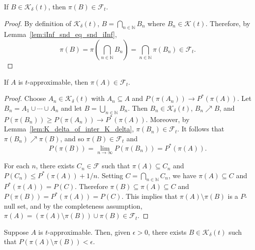 \begin{lemma}\label{lem:K_delta_of_inter_K_delta}
  \leanok
If $B \in \mathcal{K}_\delta (t)$, then $\pi(B) \in \mathcal{F}_t$.
\end{lemma}

\begin{proof}
  By definition of $\mathcal{K}_\delta(t)$, $B = \bigcap_{n\in\mathbb{N}} B_n$ where $B_n \in \mathcal{K}(t)$. Therefore, by Lemma~\ref{lem:iInf_snd_eq_snd_iInf}, \[\pi(B) = \pi \left(\bigcap_{n\in\mathbb{N}} B_n\right) = \bigcap_{n\in\mathbb{N}} \pi(B_n) \in \mathcal{F}_t .\]
\end{proof}

\begin{lemma}\label{lem:measurable_of_t_approx}
  \leanok
  If $A$ is $t$-approximable, then $\pi(A) \in \mathcal{F}_t$.
\end{lemma}

\begin{proof}
  Choose $A_n \in \mathcal{K}_\delta(t)$ with $A_n \subseteq A$ and
  $P(\pi(A_n)) \to P^*(\pi(A))$. Let $B_n = A_1 \cup \cdots \cup A_n$ and
  let $B = \bigcup_{n \in \mathbb{N}} B_n$. Then
  $B_n \in \mathcal{K}_\delta(t)$, $B_n \nearrow B$, and $P(\pi(B_n)) \geq P(\pi(A_n)) \to
  P^*(\pi(A))$.
  Moreover, by Lemma~\ref{lem:K_delta_of_inter_K_delta}, $\pi(B_n) \in \mathcal{F}_t$.
  It follows that $\pi(B_n) \nearrow \pi(B)$, and so $\pi(B) \in \mathcal{F}_t$ and
  $$P(\pi(B)) = \lim_{n \to \infty} P(\pi(B_n)) = P^*(\pi(A)).$$

  For each $n$, there exists $C_n \in \mathcal{F}$ such that
  $\pi(A) \subseteq C_n$ and $P(C_n) \leq P^*(\pi(A)) + 1/n$. Setting
  $C = \bigcap_{n \in \mathbb{N}} C_n$, we have $\pi(A) \subseteq C$ and $P^*(\pi(A)) = P(C)$.
  Therefore
  $\pi(B) \subseteq \pi(A) \subseteq C$ and $P(\pi(B)) = P^*(\pi(A)) = P(C)$.
  This implies that $\pi(A) \setminus \pi(B)$ is a $P$-null set, and by
  the completeness assumption, $\pi(A) = (\pi(A) \setminus \pi(B)) \cup \pi(B) \in \mathcal{F}_t$.
\end{proof}

\begin{lemma}\label{lem:exists_B_of_t_approx}
  \leanok
  Suppose $A$ is $t$-approximable. Then, given $\epsilon > 0$, there exists
  $B \in \mathcal{K}_\delta (t)$ such that $P(\pi(A) \setminus \pi(B)) < \epsilon$.
\end{lemma}

